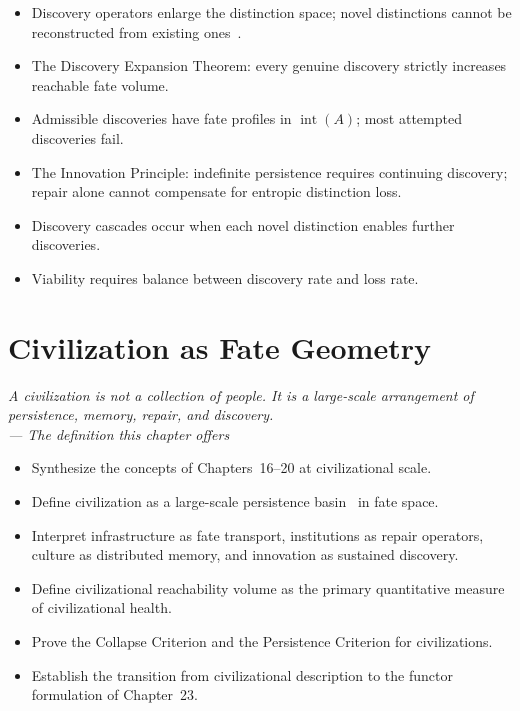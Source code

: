 \documentclass[12pt,twoside,openright]{book}
\newcommand{\admRegion}{A}
\newenvironment{epigraph}[2]{%
  \vspace{1em}\begin{flushright}
  \begin{minipage}{0.72\textwidth}
  \itshape\small #1\\[0.4em]
  \upshape\footnotesize\sffamily\color{DistGray}--- #2
  \end{minipage}\end{flushright}\vspace{1.5em}}{}
\newenvironment{objectives}{%
  \begin{tcolorbox}[colback=DistBlue!5,colframe=DistBlue,
    title={\faCheckCircle\enspace Chapter Objectives},
    fonttitle=\sffamily\bfseries\color{white},
    attach boxed title to top left={yshift=-2mm,xshift=4mm},
    boxed title style={colback=DistBlue},breakable]
  \begin{itemize}[leftmargin=*,nosep]}{%
  \end{itemize}\end{tcolorbox}\vspace{1em}}
\newenvironment{chapsummary}{%
  \begin{tcolorbox}[colback=DistBlue!5,colframe=DistBlue,
    title={\faBookOpen\enspace Summary},
    fonttitle=\sffamily\bfseries\color{white},
    attach boxed title to top left={yshift=-2mm,xshift=4mm},
    boxed title style={colback=DistBlue,rounded corners}]
  \begin{itemize}[nosep,leftmargin=*]}{%
  \end{itemize}\end{tcolorbox}}
\providecommand{\admRegion}{A}
\begin{document}
\begin{chapsummary}
\item Discovery operators enlarge the distinction space;
  novel distinctions cannot be reconstructed from existing ones~\cite{holland1998}.
\item The Discovery Expansion Theorem: every genuine discovery
  strictly increases reachable fate volume.
\item Admissible discoveries have fate profiles in
  $\operatorname{int}(\admRegion)$; most attempted discoveries
  fail.
\item The Innovation Principle: indefinite persistence requires
  continuing discovery; repair alone cannot compensate for
  entropic distinction loss.
\item Discovery cascades occur when each novel distinction
  enables further discoveries.
\item Viability requires balance between discovery rate and
  loss rate.
\end{chapsummary}


\chapter{Civilization as Fate Geometry}
\label{ch:civilization-fate}

\begin{epigraph}{A civilization is not a collection of people.
  It is a large-scale arrangement of persistence, memory,
  repair, and discovery.}{The definition this chapter offers}
\end{epigraph}

\begin{objectives}
\item Synthesize the concepts of Chapters~16--20 at
  civilizational scale.
\item Define civilization as a large-scale persistence basin~\cite{levin1998}
  in fate space.
\item Interpret infrastructure as fate transport, institutions
  as repair operators, culture as distributed memory, and
  innovation as sustained discovery.
\item Define civilizational reachability volume as the primary
  quantitative measure of civilizational health.
\item Prove the Collapse Criterion and the Persistence Criterion
  for civilizations.
\item Establish the transition from civilizational description
  to the functor formulation of Chapter~23.
\end{objectives}
\end{document}
